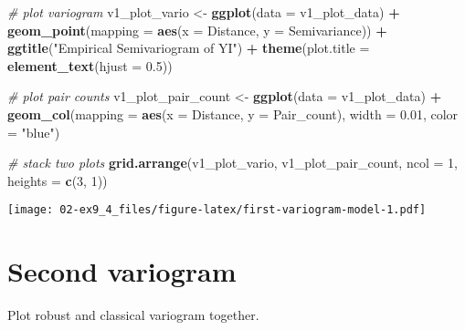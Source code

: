 \documentclass[]{book}
\newenvironment{Shaded}{\begin{snugshade}}{\end{snugshade}}
\newcommand{\CommentTok}[1]{\textcolor[rgb]{0.56,0.35,0.01}{\textit{#1}}}
\newcommand{\DataTypeTok}[1]{\textcolor[rgb]{0.13,0.29,0.53}{#1}}
\newcommand{\DecValTok}[1]{\textcolor[rgb]{0.00,0.00,0.81}{#1}}
\newcommand{\FloatTok}[1]{\textcolor[rgb]{0.00,0.00,0.81}{#1}}
\newcommand{\KeywordTok}[1]{\textcolor[rgb]{0.13,0.29,0.53}{\textbf{#1}}}
\newcommand{\NormalTok}[1]{#1}
\newcommand{\OperatorTok}[1]{\textcolor[rgb]{0.81,0.36,0.00}{\textbf{#1}}}
\newcommand{\StringTok}[1]{\textcolor[rgb]{0.31,0.60,0.02}{#1}}
\begin{document}
\begin{Shaded}
\begin{Highlighting}[]
\CommentTok{# plot variogram}
\NormalTok{v1_plot_vario <-}\StringTok{ }\KeywordTok{ggplot}\NormalTok{(}\DataTypeTok{data =}\NormalTok{ v1_plot_data) }\OperatorTok{+}
\StringTok{  }\KeywordTok{geom_point}\NormalTok{(}\DataTypeTok{mapping =} \KeywordTok{aes}\NormalTok{(}\DataTypeTok{x =}\NormalTok{ Distance, }\DataTypeTok{y =}\NormalTok{ Semivariance)) }\OperatorTok{+}
\StringTok{  }\KeywordTok{ggtitle}\NormalTok{(}\StringTok{"Empirical Semivariogram of YI"}\NormalTok{) }\OperatorTok{+}
\StringTok{  }\KeywordTok{theme}\NormalTok{(}\DataTypeTok{plot.title =} \KeywordTok{element_text}\NormalTok{(}\DataTypeTok{hjust =} \FloatTok{0.5}\NormalTok{))}

\CommentTok{# plot pair counts}
\NormalTok{v1_plot_pair_count <-}\StringTok{ }\KeywordTok{ggplot}\NormalTok{(}\DataTypeTok{data =}\NormalTok{ v1_plot_data) }\OperatorTok{+}
\StringTok{  }\KeywordTok{geom_col}\NormalTok{(}\DataTypeTok{mapping =} \KeywordTok{aes}\NormalTok{(}\DataTypeTok{x =}\NormalTok{ Distance, }\DataTypeTok{y =}\NormalTok{ Pair_count), }\DataTypeTok{width =} \FloatTok{0.01}\NormalTok{, }\DataTypeTok{color =} \StringTok{"blue"}\NormalTok{)}

\CommentTok{# stack two plots}
\KeywordTok{grid.arrange}\NormalTok{(v1_plot_vario, v1_plot_pair_count,}
             \DataTypeTok{ncol =} \DecValTok{1}\NormalTok{, }\DataTypeTok{heights =} \KeywordTok{c}\NormalTok{(}\DecValTok{3}\NormalTok{, }\DecValTok{1}\NormalTok{))}
\end{Highlighting}
\end{Shaded}

\texttt{[image: 02-ex9\_4\_files/figure-latex/first-variogram-model-1.pdf]}

\hypertarget{second-variogram}{%
\section{Second variogram}\label{second-variogram}}

Plot robust and classical variogram together.

\begin{Shaded}
\end{Shaded}
\end{document}
